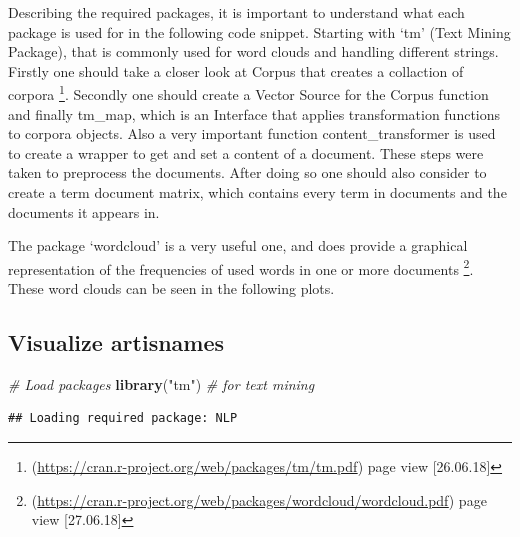 \documentclass[]{article}
\newenvironment{Shaded}{\begin{snugshade}}{\end{snugshade}}
\newcommand{\KeywordTok}[1]{\textcolor[rgb]{0.13,0.29,0.53}{\textbf{#1}}}
\newcommand{\StringTok}[1]{\textcolor[rgb]{0.31,0.60,0.02}{#1}}
\newcommand{\CommentTok}[1]{\textcolor[rgb]{0.56,0.35,0.01}{\textit{#1}}}
\newcommand{\NormalTok}[1]{#1}
\let\rmarkdownfootnote\footnote%
\def\footnote{\protect\rmarkdownfootnote}
\begin{document}
Describing the required packages, it is important to understand what
each package is used for in the following code snippet. Starting with
`tm' (Text Mining Package), that is commonly used for word clouds and
handling different strings. Firstly one should take a closer look at
Corpus that creates a collaction of corpora \footnote{(\url{https://cran.r-project.org/web/packages/tm/tm.pdf})
  page view {[}26.06.18{]}}. Secondly one should create a Vector Source
for the Corpus function and finally tm\_map, which is an Interface that
applies transformation functions to corpora objects. Also a very
important function content\_transformer is used to create a wrapper to
get and set a content of a document. These steps were taken to
preprocess the documents. After doing so one should also consider to
create a term document matrix, which contains every term in documents
and the documents it appears in.

The package `wordcloud' is a very useful one, and does provide a
graphical representation of the frequencies of used words in one or more
documents \footnote{(\url{https://cran.r-project.org/web/packages/wordcloud/wordcloud.pdf})
  page view {[}27.06.18{]}}. These word clouds can be seen in the
following plots.

\subsection{Visualize artisnames}\label{visualize-artisnames}

\begin{Shaded}
\begin{Highlighting}[]
\CommentTok{# Load packages}
\KeywordTok{library}\NormalTok{(}\StringTok{"tm"}\NormalTok{) }\CommentTok{# for text mining}
\end{Highlighting}
\end{Shaded}

\begin{verbatim}
## Loading required package: NLP
\end{verbatim}
\end{document}
